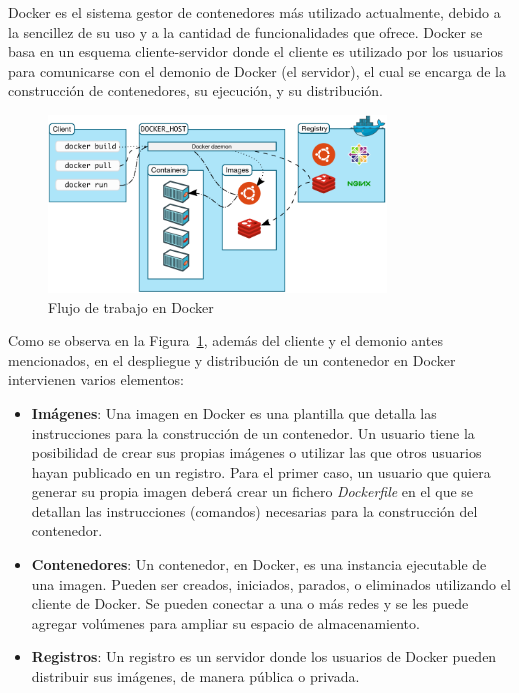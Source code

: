 Docker es el sistema gestor de contenedores más utilizado actualmente, debido a la sencillez de su uso y a la cantidad de funcionalidades que ofrece. Docker se basa en un esquema cliente-servidor donde el cliente es utilizado por los usuarios para comunicarse con el demonio de Docker (el servidor), el cual se encarga de la construcción de contenedores, su ejecución, y su distribución. \emph{\parencite{Reference20}}

\begin{figure}[ht]
    \centering
    \includegraphics[width=0.8\textwidth]{Figures/docker-workflow}
    \decoRule
    \caption[Docker (\emph{Workflow})]{Flujo de trabajo en Docker \emph{\parencite{Reference20}}}
    \label{fig:docker-workflow}
\end{figure}

Como se observa en la Figura~\ref{fig:docker-workflow}, además del cliente y el demonio antes mencionados, en el despliegue y distribución de un contenedor en Docker intervienen varios elementos:

\begin{itemize}
    \item \textbf{Imágenes}: Una imagen en Docker es una plantilla que detalla las instrucciones para la construcción de un contenedor. Un usuario tiene la posibilidad de crear sus propias imágenes o utilizar las que otros usuarios hayan publicado en un registro. Para el primer caso, un usuario que quiera generar su propia imagen deberá crear un fichero \emph{Dockerfile} en el que se detallan las instrucciones (comandos) necesarias para la construcción del contenedor.
    \item \textbf{Contenedores}: Un contenedor, en Docker, es una instancia ejecutable de una imagen. Pueden ser creados, iniciados, parados, o eliminados utilizando el cliente de Docker. Se pueden conectar a una o más redes y se les puede agregar volúmenes para ampliar su espacio de almacenamiento.
    \item \textbf{Registros}: Un registro es un servidor donde los usuarios de Docker pueden distribuir sus imágenes, de manera pública o privada.
\end{itemize}

